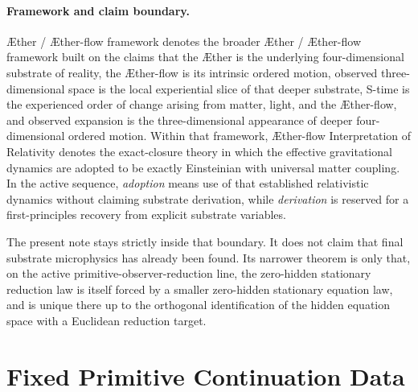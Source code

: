 \documentclass[11pt]{article}
\newcommand{\Aether}{\AE{}ther}
\newcommand{\Aflow}{\AE{}ther-flow}
\newcommand{\TheoryName}{\Aflow{} Interpretation of Relativity}
\newcommand{\TheoryProgram}{\Aether{} / \Aflow{} framework}
\begin{document}
\paragraph{Framework and claim boundary.}
\TheoryProgram{} denotes the broader \Aether{} / \Aflow{} framework built on the claims that the \Aether{} is the underlying four-dimensional substrate of reality, the \Aflow{} is its intrinsic ordered motion, observed three-dimensional space is the local experiential slice of that deeper substrate, S-time is the experienced order of change arising from matter, light, and the \Aflow{}, and observed expansion is the three-dimensional appearance of deeper four-dimensional ordered motion. Within that framework, \TheoryName{} denotes the exact-closure theory in which the effective gravitational dynamics are adopted to be exactly Einsteinian with universal matter coupling. In the active sequence, \emph{adoption} means use of that established relativistic dynamics without claiming substrate derivation, while \emph{derivation} is reserved for a first-principles recovery from explicit substrate variables.

The present note stays strictly inside that boundary. It does not claim that final substrate microphysics has already been found. Its narrower theorem is only that, on the active primitive-observer-reduction line, the zero-hidden stationary reduction law is itself forced by a smaller zero-hidden stationary equation law, and is unique there up to the orthogonal identification of the hidden equation space with a Euclidean reduction target.

\section{Fixed Primitive Continuation Data}
\end{document}
